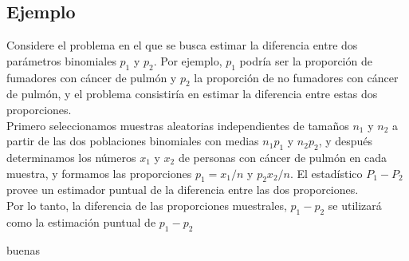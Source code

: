 \documentclass[letterpaper,12pt]{article}
\begin{document}
\begin{sloppypar}
\subsection{Ejemplo}
Considere el problema en el que se busca estimar la diferencia entre dos parámetros binomiales $p_1$ y $p_2$. Por ejemplo, $p_1$ podría ser la proporción de fumadores con cáncer de pulmón y $p_2$ la proporción de no fumadores con cáncer de pulmón, y el problema consistiría en estimar la diferencia entre estas dos proporciones.
\vspace{0.3cm}\\ 
Primero seleccionamos muestras aleatorias independientes de tamaños $n_1$ y $n_2$ a partir de las dos poblaciones binomiales con medias $n_1p_1$ y $n_2p_2$, y después determinamos los números $x_1$ y $x_2$ de personas con cáncer de pulmón en cada muestra, y formamos las proporciones $p_1 = x_1 / n $ y $p_2 x_2 / n$. El estadístico $P_1 - P_2$ provee un estimador puntual de la diferencia entre las dos proporciones.
\vspace{0.3cm}\\
Por lo tanto, la diferencia de las proporciones muestrales, $p_1 - p_2$ se utilizará como la estimación puntual de $p_1 - p_2$

buenas
\end{sloppypar}
\end{document}
